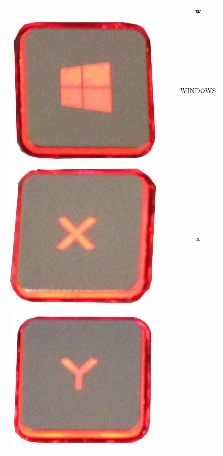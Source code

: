 \begin{longtable}{cccc}
\begin{minipage}[c]{.3\textwidth}
\vspace{0.2cm}
\end{minipage} & & & w\\
\hline
\begin{minipage}[c]{.3\textwidth}
\vspace{0.2cm}
\includegraphics[scale=0.1]{Images/KeyMapping/WINDOWS}
\vspace{0.2cm}
\end{minipage} & & & WINDOWS\\
\hline
\begin{minipage}[c]{.3\textwidth}
\vspace{0.2cm}
\includegraphics[scale=0.1]{Images/KeyMapping/x}
\vspace{0.2cm}
\end{minipage} & & & x\\
\hline
\begin{minipage}[c]{.3\textwidth}
\vspace{0.2cm}
\includegraphics[scale=0.1]{Images/KeyMapping/y}

\end{minipage}
\end{longtable}
